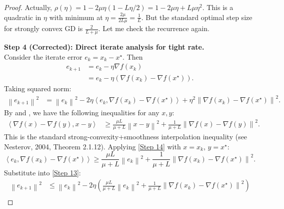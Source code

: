 \documentclass{article}
\newcommand{\norm}[1]{\left\|#1\right\|}
\newcommand{\inner}[2]{\left\langle #1, #2 \right\rangle}
\newcommand{\stepsize}{\eta}
\newcommand{\lipschitz}{L}
\newcommand{\strongconvex}{\mu}
\newcommand{\opt}{x^\star}
\newcommand{\grad}{\nabla}
\begin{document}
\begin{proof}
    Actually, $\rho(\stepsize) = 1 - 2\strongconvex\stepsize(1 - \lipschitz\stepsize/2) = 1 - 2\strongconvex\stepsize + \lipschitz\strongconvex\stepsize^2$.
    This is a quadratic in $\stepsize$ with minimum at $\stepsize = \frac{2\strongconvex}{2\lipschitz\strongconvex} = \frac{1}{\lipschitz}$.
    But the standard optimal step size for strongly convex GD is $\frac{2}{L+\mu}$. Let me check the recurrence again.

    \textbf{Step 4 (Corrected): Direct iterate analysis for tight rate.} \\
    Consider the iterate error $e_k = x_k - \opt$. Then
    \begin{align}
        e_{k+1} &= e_k - \stepsize \grad f(x_k) \\
        &= e_k - \stepsize (\grad f(x_k) - \grad f(\opt)).
    \end{align}
    Taking squared norm:
    \begin{align}
        \norm{e_{k+1}}^2 &= \norm{e_k}^2 - 2\stepsize \inner{e_k}{\grad f(x_k) - \grad f(\opt)} + \stepsize^2 \norm{\grad f(x_k) - \grad f(\opt)}^2. \tag{Step 13}
    \end{align}
    By  and , we have the following inequalities for any $x, y$:
    \begin{align}
        \inner{\grad f(x) - \grad f(y)}{x - y} &\ge \frac{\strongconvex \lipschitz}{\strongconvex + \lipschitz} \norm{x - y}^2 + \frac{1}{\strongconvex + \lipschitz} \norm{\grad f(x) - \grad f(y)}^2. \tag{Step 14}
    \end{align}
    This is the standard strong-convexity+smoothness interpolation inequality (see Nesterov, 2004, Theorem 2.1.12).
    Applying \eqref{Step 14} with $x = x_k$, $y = \opt$:
    \begin{equation}
        \inner{e_k}{\grad f(x_k) - \grad f(\opt)} \ge \frac{\strongconvex \lipschitz}{\strongconvex + \lipschitz} \norm{e_k}^2 + \frac{1}{\strongconvex + \lipschitz} \norm{\grad f(x_k) - \grad f(\opt)}^2. \tag{Step 15}
    \end{equation}
    Substitute into \eqref{Step 13}:
    \begin{align}
        \norm{e_{k+1}}^2 &\le \norm{e_k}^2 - 2\stepsize \left( \frac{\strongconvex \lipschitz}{\strongconvex + \lipschitz} \norm{e_k}^2 + \frac{1}{\strongconvex + \lipschitz} \norm{\grad f(x_k) - \grad f(\opt)}^2 \right) \\

\end{align}
\end{proof}
\end{document}
